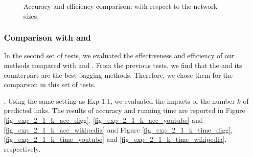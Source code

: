 \begin{figure}[tb!]
  \hspace{-2ex}
  \hspace{-2ex}
  \vspace{-2ex}
  \caption{Accuracy and efficiency comparison: with respect to the network sizes.}\label{fig_exp_2_2}
  \vspace{-3ex}
\end{figure}


\subsubsection{Comparison with \Aa and \BIGCLAM}
In the second set of tests, we evaluated the effectiveness and efficiency of our
methods compared with \Aa and \BIGCLAM. From the previous tests, we find that the
\Biasedp and its counterpart \Biased are the best bagging methods. Therefore, we
chose them for the comparison in this set of tests.


. Using the same setting as Exp-1.1, we evaluated
the impacts of the number $k$ of predicted links.
The results of accuracy and running time are reported in Figure \ref{fig_exp_2_1_k_acc_digg},
\ref{fig_exp_2_1_k_acc_youtube} and \ref{fig_exp_2_1_k_acc_wikipedia}
and Figure \ref{fig_exp_2_1_k_time_digg},  \ref{fig_exp_2_1_k_time_youtube} and
\ref{fig_exp_2_1_k_time_wikipedia}, respectively.


